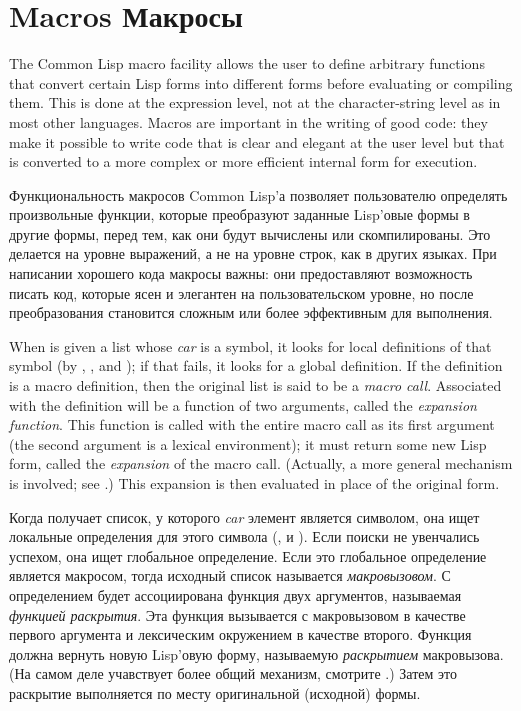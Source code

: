 
\clearpage\def\pagestatus{ULTIMATE}

\chapter{Macros Макросы}
\label{MACROS}


The Common Lisp macro facility allows the user to define arbitrary
functions that convert certain Lisp forms into different forms before
evaluating or compiling them.  This is done at the expression level,
not at the character-string level as in most other languages.  Macros
are important in the writing of good code: they make it possible to
write code that is clear and elegant at the user level but that is
converted to a more complex or more efficient internal form for
execution.

Функциональность макросов Common Lisp'а позволяет пользователю определять
произвольные функции, которые преобразуют заданные Lisp'овые формы в другие
формы, перед тем, как они будут вычислены или скомпилированы. Это делается на
уровне выражений, а не на уровне строк, как в других языках. При написании
хорошего кода макросы важны: они предоставляют возможность писать код, которые
ясен и элегантен на пользовательском уровне, но после преобразования становится
сложным или более эффективным для выполнения.

When  is given a list whose \emph{car} is a symbol, it looks
for local definitions of that symbol (by , ,
and ); if that fails, it looks for a global definition.
If the definition is a macro definition, then the original
list is said to be a \emph{macro call}.  Associated with the definition
will be a function of two arguments, called the \emph{expansion function}.
This function is called with the entire macro call as its first argument
(the second argument is a lexical environment);
it must return some new Lisp form, called the \emph{expansion} of the
macro call.  (Actually, a more general mechanism is involved;
see .)
This expansion is then evaluated in place of the original
form.

Когда  получает список, у которого \emph{car} элемент является
символом, она ищет локальные определения для этого символа (,
 и ). Если поиски не увенчались успехом, она ищет
глобальное определение. Если это глобальное определение является макросом, тогда
исходный список называется \emph{макровызовом}. С определением будет
ассоциирована функция двух аргументов, называемая \emph{функцией раскрытия}. 
Эта функция вызывается с макровызовом в качестве первого аргумента и лексическим
окружением в качестве второго. Функция должна вернуть новую Lisp'овую форму,
называемую \emph{раскрытием} макровызова. (На самом деле учавствует более общий
механизм, смотрите .)
Затем это раскрытие выполняется по месту оригинальной (исходной) формы.

